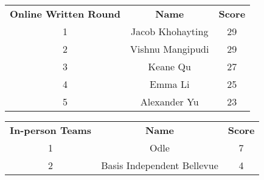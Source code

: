 \documentclass{article}
\begin{document}
\begin{minipage}[t]{.45\textwidth}
{    \begin{center}
        \begin{tabular}{c c c}
        \hline
          \textbf{Online Written Round}    & \textbf{Name} & \textbf{Score} \\
           1 & Jacob Khohayting & 29  \\
           2 & Vishnu Mangipudi & 29 \\
           3 & Keane Qu & 27 \\
           4 & Emma Li & 25 \\
           5 & Alexander Yu & 23 \\
           \hline
        \end{tabular}
    \end{center}

    \begin{center}
        \begin{tabular}{c c c}
        \hline
        \textbf{In-person Teams} & \textbf{Name} & \textbf{Score} \\
        1 & Odle & 7 \\
        2 & Basis Independent Bellevue & 4 \\ 
        \hline
        \end{tabular}
    \end{center}
}
\end{minipage}

\vspace{3mm}
\end{document}
